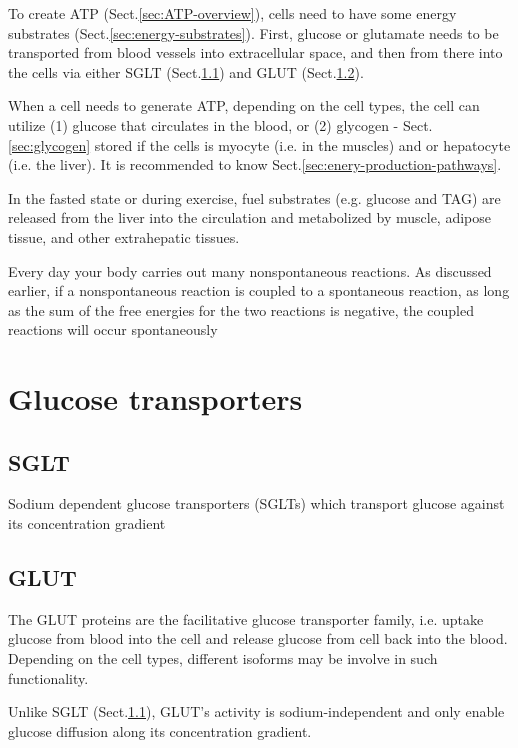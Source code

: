 To create ATP (Sect.\ref{sec:ATP-overview}), cells need to have some energy
substrates (Sect.\ref{sec:energy-substrates}). First, glucose or glutamate needs
to be transported from blood vessels into extracellular space, and then from
there into the cells via either SGLT (Sect.\ref{sec:SGLT}) and GLUT
(Sect.\ref{sec:GLUT}).

When a cell needs to generate ATP, depending on the cell types, the cell can
utilize (1) glucose that circulates in the blood, or (2) glycogen -
Sect.\ref{sec:glycogen} stored if the cells is myocyte (i.e.
in the muscles) and or hepatocyte (i.e. the liver). It is recommended to know
Sect.\ref{sec:enery-production-pathways}.

In the fasted state or during exercise, fuel substrates (e.g. glucose and TAG)
are released from the liver into the circulation and metabolized by muscle,
adipose tissue, and other extrahepatic tissues.

Every day your body carries out many nonspontaneous reactions. As discussed
earlier, if a nonspontaneous reaction is coupled to a spontaneous reaction, as
long as the sum of the free energies for the two reactions is negative, the
coupled reactions will occur spontaneously

\section{Glucose transporters}
\label{sec:glucose-transporters}


\subsection{SGLT}
\label{sec:SGLT}

Sodium dependent glucose transporters (SGLTs) which transport glucose against
its concentration gradient



\subsection{GLUT}
\label{sec:GLUT}

The GLUT proteins are the facilitative glucose transporter family, i.e. uptake
glucose from blood into the cell and release glucose from cell back into the
blood. Depending on the cell types, different isoforms may be involve in such
functionality.

Unlike SGLT (Sect.\ref{sec:SGLT}), GLUT's activity is sodium-independent and
only enable glucose diffusion along its concentration gradient.


